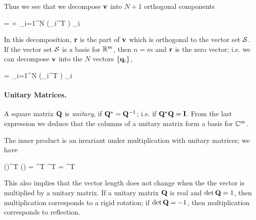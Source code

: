 Thus we see that we decompose $\mathbf{v}$ into $N+1$ orthogonal components

\bee
\vbf = \rbf + \sum_{i=1}^N (\qbf_i^T \vbf) \qbf_i
\eee

In this decomposition, $\mathbf{r}$ is the part of $\mathbf{v}$ which is orthogonal to the vector set $\mathcal{S}$. If the vector set $\mathcal{S}$ is a basis for $\mathbb{R}^m$, then $n = m$ and $\mathbf{r}$ is the zero vector; i.e. we can decompose $\mathbf{v}$ into the $N$ vectors $\{\mathbf{q}_i\}$,

\bee
\vbf = \sum_{i=1}^N (\qbf_i^T \vbf) \qbf_i
\eee

\paragraph{Unitary Matrices.} A square matrix $\mathbf{Q}$ is \emph{unitary}, if $\mathbf{Q}^\star = \mathbf{Q}^{-1}$; i.e. if $\mathbf{Q}^\star \mathbf{Q} = \mathbf{I}$. From the last expression we deduce that the columns of a unitary matrix form a basis for $\mathbb{C}^m$.

The inner product is an invariant under multiplication with unitary matrices; we have

\bee
(\Qbf \xbf)^T (\Qbf \xbf) = \xbf^T \Qbf^T \Qbf \xbf = \xbf^T \xbf
\eee

This also implies that the vector length does not change when the the vector is multiplied by a unitary matrix. If a unitary matrix $\mathbf{Q}$ is real and $\det \mathbf{Q} = 1$, then multiplication corresponds to a rigid rotation; if $\det \mathbf{Q} = -1$, then multiplication corresponds to reflection.

